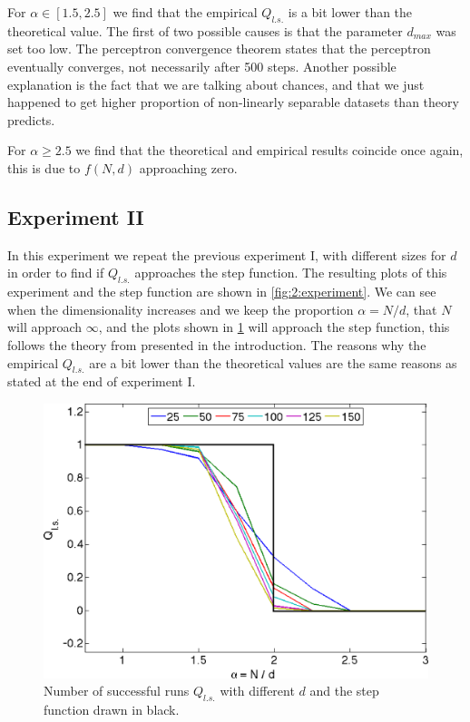 For $\alpha \in [1.5, 2.5]$ we find that the empirical $Q_{l.s.}$ is a bit lower than the theoretical value. The first of two possible causes is that the parameter $d_{max}$ was set too low. The perceptron convergence theorem states that the perceptron eventually converges, not necessarily after 500 steps. Another possible explanation is the fact that we are talking about chances, and that we just happened to get higher proportion of non-linearly separable datasets than theory predicts. 

For $\alpha \geq 2.5$ we find that the theoretical and empirical results coincide once again, this is due to $f(N,d)$ approaching zero.

\subsection*{Experiment II}

In this experiment we repeat the previous experiment I, with different sizes for $d$ in order to find if $Q_{l.s.}$ approaches the step function. The resulting plots of this experiment and the step function are shown in \vref{fig:2:experiment}. We can see when the dimensionality increases and we keep the proportion $\alpha = N/d$, that $N$ will approach $\infty$, and the plots shown in \cref{fig:2:experiment} will approach the step function, this follows the theory from \textcite{cover1965geometrical} presented in the introduction. The reasons why the empirical $Q_{l.s.}$ are a bit lower than the theoretical values are the same reasons as stated at the end of experiment I.

\begin{figure}[H]
	\centering
	\includegraphics[width=\columnwidth]{./img/assignmentb}
	\caption{Number of successful runs $Q_{l.s.}$ with different $d$ and the step function drawn in black.}
	\label{fig:2:experiment}
\end{figure}